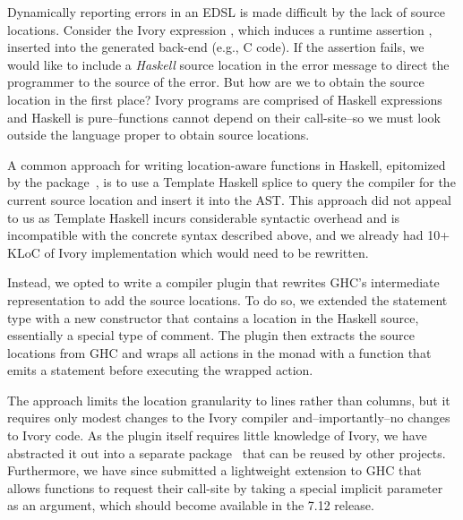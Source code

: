 
Dynamically reporting errors in an EDSL is made difficult by the lack of
source locations. Consider the Ivory expression \hbox{,} which induces a
runtime assertion , inserted into the generated back-end (e.g., C code). If the assertion fails, we would like to include
a \emph{Haskell} source location in the error message to direct the programmer to the source of
the error. But how are we to obtain the source location in the first place?
Ivory programs are comprised of Haskell expressions and Haskell is
pure--functions cannot depend on their call-site--so we must look outside the
language proper to obtain source locations.

A common approach for writing location-aware functions in Haskell, epitomized by
the  package~\cite{file-location}, is to use a Template
Haskell splice to query the compiler for the current source location and insert
it into the AST. This approach did not appeal to us as Template Haskell incurs
considerable syntactic overhead and is incompatible with the concrete syntax
described above, and we already had 10+ KLoC of Ivory implementation which would need to be
rewritten.

Instead, we opted to write a compiler plugin that rewrites GHC's intermediate
representation to add the source locations. To do so, we extended the  statement type with a new
 constructor that contains a location in the Haskell source,
essentially a special type of comment. The plugin then extracts the source
locations from GHC and wraps all actions in the  monad with a
 function that emits a  statement before executing
the wrapped action.

The approach limits the location granularity to
lines rather than columns, but it requires only modest changes to the
Ivory compiler and--importantly--no changes to Ivory code. As the plugin
itself requires little knowledge of Ivory, we have abstracted it out into a
separate package~\cite{ghc-srcspan-plugin} that can be reused by other projects.
Furthermore, we have since submitted a lightweight extension to GHC that allows
functions to request their call-site by taking a special implicit
parameter~\cite{lewis2000implicit} as an argument, which should become available
in the 7.12 release.
